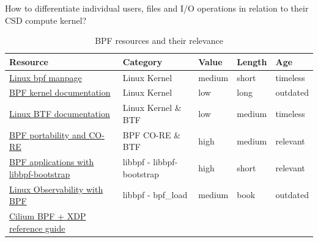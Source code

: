 \documentclass[conference]{IEEEtran}
\newcommand\bashstyle{
	\lstset{
		language=Bash,
		basicstyle=\ttm,
		showstringspaces=false,
		tabsize=2,
		aboveskip=0.2cm,
		belowskip=0.2cm,
		prebreak=\textbackslash,
		extendedchars=true,
		mathescape=false,
		linewidth=8.85cm,
		breaklines=true
	}
}
\newcommand\bashexternal[2][]{{\bashstyle}}
\begin{document}
How to differentiate individual users, files and I/O operations in relation to
their CSD compute kernel?




\begin{table}[h!]
	\caption{BPF resources and their relevance}
	\label{table:bpfresources}
	\centering
	\begin{adjustbox}{width=0.5\textwidth}
		\begin{threeparttable}[]
			\begin{tabular}{lllll}
				\toprule
				\textbf{Resource} & \textbf{Category} & \textbf{Value} &
				\textbf{Length} & \textbf{Age} \\
				\midrule
				\href{https://www.man7.org/linux/man-pages/man2/bpf.2.html}{Linux bpf manpage}\cite{bpfman} &
				Linux Kernel & medium & short & timeless \\
				\href{https://www.kernel.org/doc/Documentation/networking/filter.txt}{BPF kernel documentation}\cite{Linuxbpf} &
				Linux Kernel & low & long & outdated \\
				\href{https://www.kernel.org/doc/html/latest/bpf/btf.html}{Linux BTF documentation}\cite{Linuxbtf} &
				Linux Kernel \& BTF & low & medium & timeless \\
				\href{https://facebookmicrosites.github.io/bpf/blog/2020/02/19/bpf-portability-and-co-re.html}{BPF portability and CO-RE}\cite{bpfport} &
				BPF CO-RE \& BTF & high & medium & relevant \\
				\href{https://nakryiko.com/posts/libbpf-bootstrap/}{BPF applications with libbpf-bootstrap}\cite{bpfapplications} &
				libbpf - libbpf-bootstrap & high & short & relevant \\
				\href{https://www.oreilly.com/library/view/linux-observability-with/9781492050193/}{Linux Observability with BPF}\cite{observabilityoreilly} &
				libbpf - bpf\_load & medium & book & outdated \\
				\href{https://facebookmicrosites.github.io/bpf/blog/2020/02/19/bpf-portability-and-co-re.html}{Cilium BPF + XDP reference guide}\cite{ciliumbpf} &

\end{tabular}
\end{threeparttable}
\end{adjustbox}
\end{table}
\end{document}

